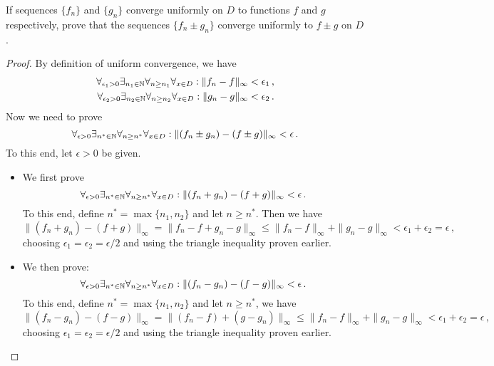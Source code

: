 \documentclass[week=5]{homework}
\begin{document}
\begin{questions}
		\question
		\begin{inlinetoprove}
			If sequences $\{f_n \}$ and $\{g_n \}$ converge uniformly on $D$ to functions $f$ and $g$ respectively, prove that the sequences $\{f_n \pm g_n \}$ converge uniformly to $f \pm g$ on $D$.
		\end{inlinetoprove}
		\begin{proof}
			By definition of uniform convergence, we have
			\begin{align*}
				\forall_{\epsilon_1 > 0}\exists_{n_1 \in \naturals}\forall_{n \geq n_1}\forall_{x\in D}: \|f_n - f\|_\infty &< \epsilon_1\,, \\
				\forall_{\epsilon_2 > 0}\exists_{n_2 \in \naturals}\forall_{n \geq n_2}\forall_{x\in D}: \|g_n - g\|_\infty &< \epsilon_2\,.
			\end{align*}
			Now we need to prove
			\[
				\forall_{\epsilon > 0}\exists_{n^* \in \naturals}\forall_{n \geq n^*}\forall_{x\in D}: \|(f_n \pm g_n) - (f \pm g)\|_\infty < \epsilon\,.
			\]
			To this end, let $\epsilon > 0$ be given.
			\begin{itemize}
				\item We first prove
				\[
				\forall_{\epsilon > 0}\exists_{n^* \in \naturals}\forall_{n \geq n^*}\forall_{x\in D}: \|(f_n + g_n) - (f + g)\|_\infty < \epsilon\,.
				\]
				To this end, define $n^* = \max\{n_1,n_2\}$ and let $n \ge n^*$. Then we have
				\[
					\|(f_n + g_n) - (f + g)\|_\infty = \|f_n - f + g_n - g\|_\infty \leq \| f_n - f\|_\infty + \| g_n - g \|_\infty < \epsilon_1 + \epsilon_2 = \epsilon\,,
				\]
				choosing $\epsilon_1 = \epsilon_2 = \epsilon/2$ and using the triangle inequality proven earlier.
				
				\item We then prove:
				\[
				\forall_{\epsilon > 0}\exists_{n^* \in \naturals}\forall_{n \geq n^*}\forall_{x\in D}: \|(f_n - g_n) - (f - g)\|_\infty < \epsilon\,.
				\]
				To this end, define $n^* = \max\{n_1,n_2\}$ and let $n \ge n^*$, we have
				\[
				\|(f_n - g_n) - (f - g)\|_\infty = \|(f_n - f )+ (g - g_n)\|_\infty \leq \| f_n - f\|_\infty + \| g_n - g \|_\infty < \epsilon_1 + \epsilon_2 = \epsilon\,,
				\]
				choosing $\epsilon_1 = \epsilon_2 = \epsilon/2$ and using the triangle inequality proven earlier.
			\end{itemize}
		\end{proof}
     \end{questions}
\end{document}
